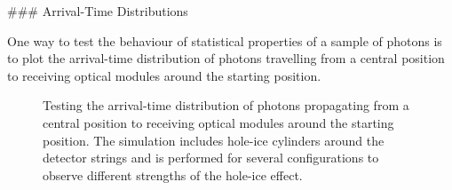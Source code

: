 ### Arrival-Time Distributions


One way to test the behaviour of statistical properties of a sample of photons is to plot the arrival-time distribution of photons travelling from a central position to receiving optical modules around the starting position.

\begin{figure}[htbp]
  \hfill
  \caption{Testing the arrival-time distribution of photons propagating from a central position to receiving optical modules around the starting position. The simulation includes hole-ice cylinders around the detector strings and is performed for several configurations to observe different strengths of the hole-ice effect.}
  \label{fig:eipau6Ag}
\end{figure}

